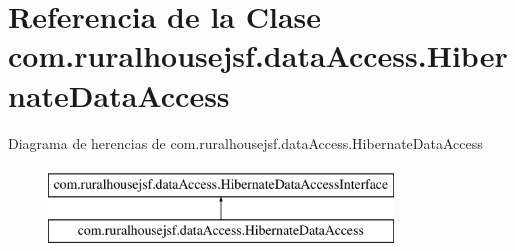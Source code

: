 \hypertarget{a00144}{}\section{Referencia de la Clase com.\+ruralhousejsf.\+data\+Access.\+Hibernate\+Data\+Access}
\label{a00144}
Diagrama de herencias de com.\+ruralhousejsf.\+data\+Access.\+Hibernate\+Data\+Access\begin{figure}[H]
\begin{center}
\leavevmode
\includegraphics[height=2.000000cm]{a00144}
\end{center}
\end{figure}
